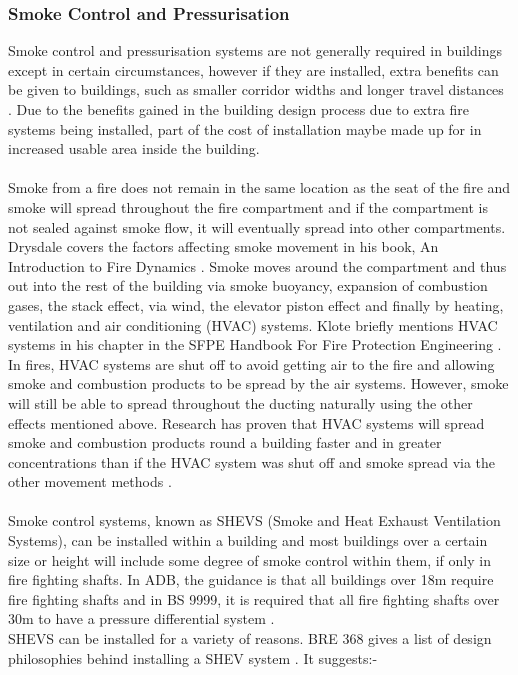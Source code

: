 \documentclass[table,a4paper,oneside]{book}
\begin{document}
\subsubsection{Smoke Control and Pressurisation}
Smoke control and pressurisation systems are not generally required in buildings except in certain circumstances, however if they are installed, extra benefits can be given to buildings, such as smaller corridor widths and longer travel distances \citep{BSI2008}. Due to the benefits gained in the building design process due to extra fire systems being installed, part of the cost of installation maybe made up for in increased usable area inside the building.
\\
\\
Smoke from a fire does not remain in the same location as the seat of the fire and smoke will spread throughout the fire compartment and if the compartment is not sealed against smoke flow, it will eventually spread into other compartments. Drysdale covers the factors affecting smoke movement in his book, An Introduction to Fire Dynamics \citep{Drysdale1998}. Smoke moves around the compartment and thus out into the rest of the building via smoke buoyancy, expansion of combustion gases, the stack effect, via wind, the elevator piston effect and finally by heating, ventilation and air conditioning (HVAC) systems. Klote briefly mentions HVAC systems in his chapter in the SFPE Handbook For Fire Protection Engineering \citep{Klote2002}. In fires, HVAC systems are shut off to avoid getting air to the fire and allowing smoke and combustion products to be spread by the air systems. However, smoke will still be able to spread throughout the ducting naturally using the other effects mentioned above. Research has proven that HVAC systems will spread smoke and combustion products round a building faster and in greater concentrations than if the HVAC system was shut off and smoke spread via the other movement methods \citep{Mowrer2004}.
\\
\\
Smoke control systems, known as SHEVS (Smoke and Heat Exhaust Ventilation Systems), can be installed within a building and most buildings over a certain size or height will include some degree of smoke control within them, if only in fire fighting shafts. In ADB, the guidance is that all buildings over 18m require fire fighting shafts and in BS 9999, it is required that all fire fighting shafts over 30m to have a pressure differential system \citep{BSI2008}.
\\
SHEVS can be installed for a variety of reasons. BRE 368 gives a list of design philosophies behind installing a SHEV system \citep{HPMorgan1999}. It suggests:- 
\end{document}
